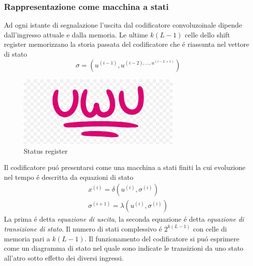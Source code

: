         \subsubsection{Rappresentazione come macchina a stati}
            Ad ogni istante di segnalazione l'uscita dal codificatore convoluzoinale dipende 
            dall'ingresso attuale e dalla memoria. Le ultime $k(L-1)$ celle dello shift register memorizzano la 
            storia passata del codificatore che é riassunta nel vettore di stato 
            \[
                \sigma = \left(u^{(i-1)},u^{(i-2),\dots, u^{(i-L+1)}}\right)  
            \]
            \begin{figure}[H]
                \centering
                \includegraphics[width = 8cm]{media/uwu.png}
                \caption{Status register}
            \end{figure}
            Il codificatore puó presentarsi come una macchina a stati finiti la cui evoluzione nel tempo
            é descritta da equazioni di stato 
            \begin{gather}
                x^{(i)} = \delta\left(u^{(i)},\sigma^{(i)}\right)\nonumber \\
                \sigma^{(i+1)} = \lambda\left(u^{(i)},\sigma^{(i)}\right)\nonumber 
            \end{gather}
            La prima é detta \emph{equazione di uscita}, la seconda equazione é detta \emph{equazione di transizione di stato}. 
            Il numero di stati complessivo é $2^{k(L-1)}$ con celle di memoria pari a $k(L-1)$. Il funzionamento del
            codificatore si puó esprimere come un diagramma di stato nel quale sono indicate le transizioni da uno stato all'atro sotto effetto dei 
            diversi ingressi.
